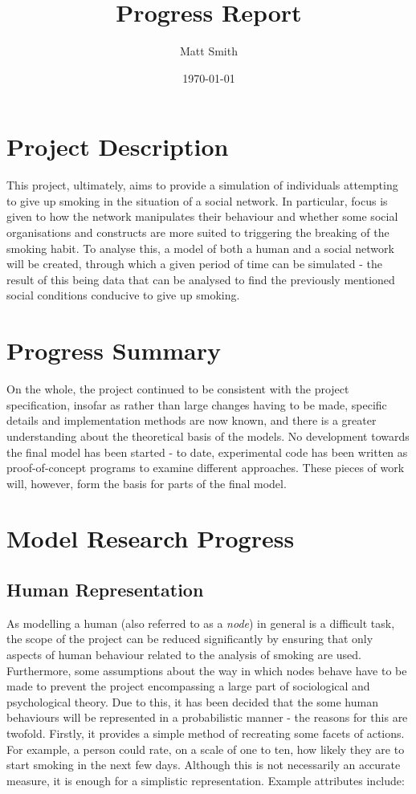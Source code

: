 \documentclass[]{article}
\begin{document}
\title{Progress Report}
\author{Matt Smith}
\date{\today}
\maketitle

\section{Project Description}

This project, ultimately, aims to provide a simulation of individuals attempting to give up smoking in the situation of a social network. In particular, focus is given to how the network manipulates their behaviour and whether some social organisations and constructs are more suited to triggering the breaking of the smoking habit. To analyse this, a model of both a human and a social network will be created, through which a given period of time can be simulated - the result of this being data that can be analysed to find the previously mentioned social conditions conducive to give up smoking.

\section{Progress Summary}

On the whole, the project continued to be consistent with the project specification, insofar as rather than large changes having to be made, specific details and implementation methods are now known, and there is a greater understanding about the theoretical basis of the models. No development towards the final model has been started - to date, experimental code has been written as proof-of-concept programs to examine different approaches. These pieces of work will, however, form the basis for parts of the final model.

\section{Model Research Progress}

\subsection{Human Representation}

As modelling a human (also referred to as a \emph{node}) in general is a difficult task, the scope of the project can be reduced significantly by ensuring that only aspects of human behaviour related to the analysis of smoking are used. Furthermore, some assumptions about the way in which nodes behave have to be made to prevent the project encompassing a large part of sociological and psychological theory. Due to this, it has been decided that the some human behaviours will be represented in a probabilistic manner - the reasons for this are twofold. Firstly, it provides a simple method of recreating some facets of actions. For example, a person could rate, on a scale of one to ten, how likely they are to start smoking in the next few days. Although this is not necessarily an accurate measure, it is enough for a simplistic representation. Example attributes include:
\end{document}

